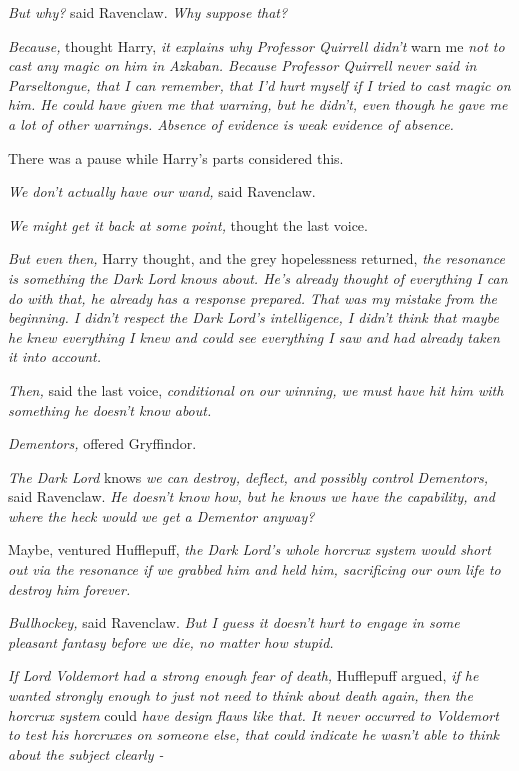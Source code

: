 \emph{But why?} said Ravenclaw. \emph{Why suppose that?}

\emph{Because,} thought Harry, \emph{it explains why Professor Quirrell didn't} warn me \emph{not to cast any magic on him in Azkaban. Because Professor Quirrell never said in Parseltongue, that I can remember, that I'd hurt myself if I tried to cast magic on him. He could have given me that warning, but he didn't, even though he gave me a lot of other warnings. Absence of evidence is weak evidence of absence.}

There was a pause while Harry's parts considered this.

\emph{We don't actually have our wand,} said Ravenclaw.

\emph{We might get it back at some point,} thought the last voice.

\emph{But even then,} Harry thought, and the grey hopelessness returned, \emph{the resonance is something the Dark Lord knows about. He's already thought of everything I can do with that, he already has a response prepared. That was my mistake from the beginning. I didn't respect the Dark Lord's intelligence, I didn't think that maybe he knew everything I knew and could see everything I saw and had already taken it into account.}

\emph{Then,} said the last voice, \emph{conditional on our winning, we must have hit him with something he doesn't know about.}

\emph{Dementors,} offered Gryffindor.

\emph{The Dark Lord} knows \emph{we can destroy, deflect, and possibly control Dementors,} said Ravenclaw. \emph{He doesn't know how, but he knows we have the capability, and where the heck would we get a Dementor anyway?}

Maybe, ventured Hufflepuff, \emph{the Dark Lord's whole horcrux system would short out via the resonance if we grabbed him and held him, sacrificing our own life to destroy him forever.}

\emph{Bullhockey,} said Ravenclaw. \emph{But I guess it doesn't hurt to engage in some pleasant fantasy before we die, no matter how stupid.}

\emph{If Lord Voldemort had a strong enough fear of death,} Hufflepuff argued, \emph{if he} \emph{wanted strongly enough to just not need to think about death again, then the horcrux system} could \emph{have design flaws like that. It never occurred to Voldemort to test his horcruxes on someone else, that could indicate he wasn't able to think about the subject clearly -}

